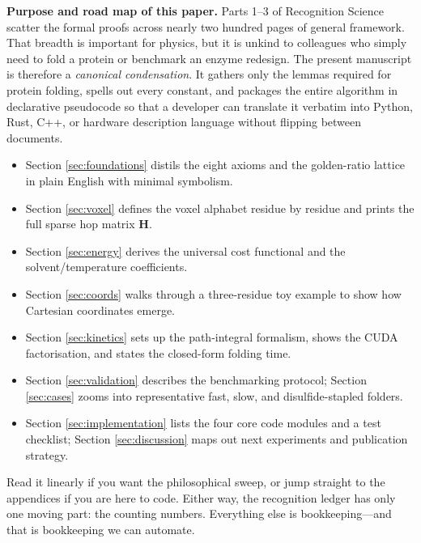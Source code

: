 \documentclass[11pt]{article}
\begin{document}
\bigskip
\noindent\textbf{Purpose and road map of this paper.}
Parts 1–3 of Recognition Science scatter the formal proofs across nearly
two hundred pages of general framework.  That breadth is important for
physics, but it is unkind to colleagues who simply need to fold a
protein or benchmark an enzyme redesign.  The present manuscript is
therefore a \emph{canonical condensation}.  It gathers only the lemmas
required for protein folding, spells out every constant, and packages
the entire algorithm in declarative pseudocode so that a developer can
translate it verbatim into Python, Rust, C++, or hardware description
language without flipping between documents.

\begin{itemize}
\item Section \ref{sec:foundations} distils the eight axioms and the
  golden-ratio lattice in plain English with minimal symbolism.

\item Section \ref{sec:voxel} defines the voxel alphabet residue by
  residue and prints the full sparse hop matrix \(\mathbf H\).

\item Section \ref{sec:energy} derives the universal cost functional and
  the solvent/temperature coefficients.

\item Section \ref{sec:coords} walks through a three-residue toy example
  to show how Cartesian coordinates emerge.

\item Section \ref{sec:kinetics} sets up the path-integral formalism,
  shows the CUDA factorisation, and states the closed-form folding time.

\item Section \ref{sec:validation} describes the benchmarking protocol;
  Section \ref{sec:cases} zooms into representative fast, slow, and
  disulfide-stapled folders.

\item Section \ref{sec:implementation} lists the four core code modules
  and a test checklist; Section \ref{sec:discussion} maps out next
  experiments and publication strategy.

\end{itemize}

Read it linearly if you want the philosophical sweep, or jump straight
to the appendices if you are here to code.  Either way, the recognition
ledger has only one moving part: the counting numbers.  Everything else
is bookkeeping—and that is bookkeeping we can automate.
\end{document}
